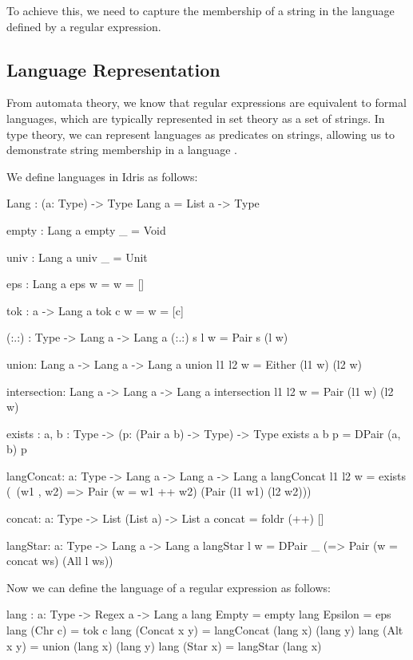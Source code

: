 \documentclass[]{rptuseminar}
\begin{document}
To achieve this, we need to capture the membership of a string in the language defined by a regular expression.

\subsection{Language Representation}
From automata theory, we know that regular expressions are equivalent to formal languages, which are typically represented in set theory as a set of strings. In type theory, we can represent languages as predicates on strings, allowing us to demonstrate string membership in a language \cite{conal2021elliott}.

We define languages in Idris as follows:

\begin{idris}
Lang : (a: Type) -> Type
Lang a = List a -> Type

empty : Lang a
empty _ = Void

univ : Lang a
univ _ = Unit 

eps : Lang a
eps w = w = []

tok : a -> Lang a
tok c w = w = [c]

(:.:) : Type -> Lang a -> Lang a  
(:.:) s l w = Pair s (l w)

union: Lang a -> Lang a -> Lang a
union l1 l2 w = Either (l1 w) (l2 w)

intersection: Lang a -> Lang a -> Lang a
intersection l1 l2 w = Pair (l1 w) (l2 w)

exists : {a, b : Type} -> (p: (Pair a b) -> Type) -> Type 
exists {a} {b} p = DPair (a, b) p 

langConcat: {a: Type} -> Lang a -> Lang a -> Lang a  
langConcat l1 l2 w = 
  exists (\ (w1 , w2) => Pair (w = w1 ++ w2) (Pair (l1 w1) (l2 w2)))

concat: {a: Type} -> List (List a) -> List a
concat = foldr (++) []

langStar: {a: Type} -> Lang a -> Lang a
langStar l w  = DPair _ (\ws => Pair (w = concat ws) (All l ws))
\end{idris}

Now we can define the language of a regular expression as follows:

\begin{idris}
lang : {a: Type} -> Regex a -> Lang a
lang Empty = empty
lang Epsilon = eps
lang (Chr c) = tok c
lang (Concat x y) = langConcat (lang x) (lang y)
lang (Alt x y) = union (lang x) (lang y)
lang (Star x) = langStar (lang x)
\end{idris}
\end{document}
